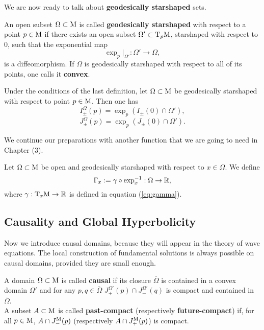 \noindent We are now ready to talk about \textbf{geodesically starshaped} sets.


\begin{definition}
	An open subset $\Omega\subset\mathrm{M}$ is called \textbf{geodesically starshaped} with respect to a point $p\in\mathrm{M}$ if there exists an open subset $\Omega'\subset\mathrm{T}_p\mathrm{M}$, starshaped with respect to 0, such that the exponential map
	\[	\exp_p|_{\Omega'}:\Omega'\to\Omega,		\]
	is a diffeomorphism. If $\Omega$ is geodesically starshaped with respect to all of its points, one calls it \textbf{convex}.
\end{definition}

\begin{prop}
	Under the conditions of the last definition, let $\Omega\subset\mathrm{M}$ be geodesically starshaped with respect to point $p\in\mathrm{M}$. Then one has
	\[	I_{\pm}^\Omega(p)=\exp_p(I_{\pm}(0)\cap\Omega'),		\]
	\[	J_{\pm}^\Omega(p)=\exp_p(J_{\pm}(0)\cap\Omega').		\]
\end{prop}

\noindent We continue our preparations with another function that we are going to need in Chapter (3).

\begin{definition}
	Let $\Omega\subset\mathrm{M}$ be open and geodesically starshaped with respect to $x\in\Omega$. We define 
	\[	\Gamma_x:=\gamma\circ\exp_x^{-1}:\Omega\to{\mathbb R},		\]
	where $\gamma:\mathrm{T}_x\mathrm{M}\to{\mathbb R}$ is defined in equation (\ref{eq:gamma}).
	\label{defn:Gamma}
\end{definition}


\subsection{Causality and Global Hyperbolicity}



Now we introduce causal domains, because they will appear in the theory of wave equations. The local construction of fundamental solutions is always possible on causal domains, provided they are small enough.


\begin{definition}
	A domain $\Omega\subset\mathrm{M}$ is called \textbf{causal} if its closure $\overline{\Omega}$ is contained in a convex domain $\Omega'$ and for any $p,q\in\overline{\Omega}$ $J_{+}^{\Omega'}(p)\cap J_{-}^{\Omega'}(q)$ is compact and contained in $\overline{\Omega}$.\\
	A subset $A\subset\mathrm{M}$ is called \textbf{past-compact} (respectively \textbf{future-compact}) if, for all $p\in\mathrm{M}$, $A\cap J_-^{\mathrm{M}}(p)$ (respectively $A\cap J_+^{\mathrm{M}}(p)$) is compact.
	\label{defn:pastcompact}
\end{definition}

